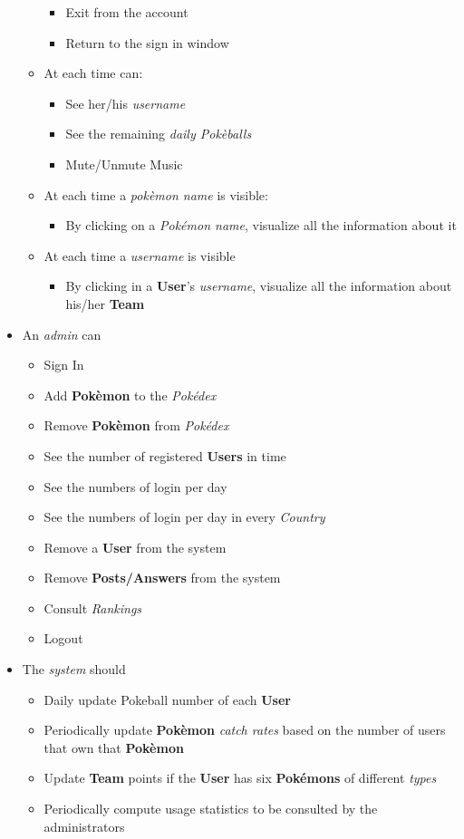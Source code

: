 \begin{itemize}
\begin{itemize}
		\begin{itemize}
			\item Exit from the account
			\item Return to the sign in window
		\end{itemize}
		\item At each time can:
		\begin{itemize}
			\item See her/his \textit{username}
			\item See the remaining \textit{daily Pokèballs}
			\item Mute/Unmute Music
		\end{itemize}
		\item At each time a \textit{pokèmon name} is visible:
		\begin{itemize}
			\item By clicking on a \textit{Pokémon name}, visualize all the information about it
		\end{itemize}
		\item At each time a \textit{username} is visible
		\begin{itemize}
			\item By clicking in a \textbf{User}’s \textit{username}, visualize all the information about his/her \textbf{Team}
		\end{itemize}
	\end{itemize}
	\item An \textit{admin} can
	\begin{itemize}
		\item Sign In
		\item Add \textbf{Pokèmon} to the \textit{Pokédex}
		\item Remove \textbf{Pokèmon} from \textit{Pokédex}
		\item See the number of registered \textbf{Users} in time
		\item See the numbers of login per day
		\item See the numbers of login per day in every \textit{Country}
		\item Remove a \textbf{User} from the system
		\item Remove \textbf{Posts/Answers} from the system
		\item Consult \textit{Rankings}
		\item Logout
\end{itemize}
	\item The \textit{system} should
	\begin{itemize}
		\item Daily update Pokeball number of each \textbf{User}
		\item Periodically update \textbf{Pokèmon} \textit{catch rates} based on the number of users that own that \textbf{Pokèmon}
		\item Update \textbf{Team} points if the \textbf{User} has six \textbf{Pokémons} of different \textit{types}
		\item Periodically compute usage statistics to be consulted by the administrators
	\end{itemize}
\end{itemize}

